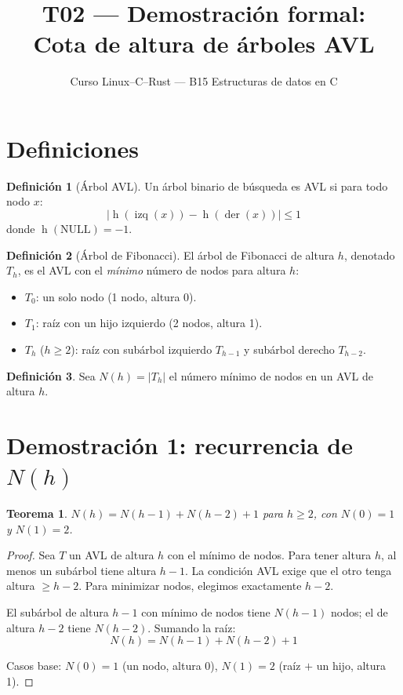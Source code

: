 \documentclass[11pt, letterpaper]{article}
\title{%
  T02 --- Demostración formal:\\[4pt]
  Cota de altura de árboles AVL
}
\author{Curso Linux--C--Rust --- B15 Estructuras de datos en C}
\date{}
\theoremstyle{definition}
\newtheorem{definition}{Definición}[section]
\theoremstyle{plain}
\newtheorem{theorem}{Teorema}[section]
\theoremstyle{remark}
\begin{document}
\maketitle
\tableofcontents

\section{Definiciones}

\begin{definition}[Árbol AVL]
Un árbol binario de búsqueda es AVL si para todo nodo $x$:
\[
  |\operatorname{h}(\operatorname{izq}(x)) - \operatorname{h}(\operatorname{der}(x))| \leq 1
\]
donde $\operatorname{h}(\text{NULL}) = -1$.
\end{definition}

\begin{definition}[Árbol de Fibonacci]
El árbol de Fibonacci de altura $h$, denotado $T_h$, es el AVL con el
\emph{mínimo} número de nodos para altura $h$:
\begin{itemize}
  \item $T_0$: un solo nodo (1 nodo, altura 0).
  \item $T_1$: raíz con un hijo izquierdo (2 nodos, altura 1).
  \item $T_h$ ($h \geq 2$): raíz con subárbol izquierdo $T_{h-1}$
    y subárbol derecho $T_{h-2}$.
\end{itemize}
\end{definition}

\begin{definition}
Sea $N(h) = |T_h|$ el número mínimo de nodos en un AVL de altura $h$.
\end{definition}

\section{Demostración 1: recurrencia de \texorpdfstring{$N(h)$}{N(h)}}

\begin{theorem}\label{thm:recurrence}
$N(h) = N(h-1) + N(h-2) + 1$ para $h \geq 2$, con $N(0) = 1$ y
$N(1) = 2$.
\end{theorem}

\begin{proof}
Sea $T$ un AVL de altura $h$ con el mínimo de nodos. Para tener
altura $h$, al menos un subárbol tiene altura $h-1$. La condición AVL
exige que el otro tenga altura $\geq h-2$. Para minimizar nodos,
elegimos exactamente $h-2$.

El subárbol de altura $h-1$ con mínimo de nodos tiene $N(h-1)$ nodos;
el de altura $h-2$ tiene $N(h-2)$. Sumando la raíz:
\[
  N(h) = N(h-1) + N(h-2) + 1
\]

Casos base: $N(0) = 1$ (un nodo, altura 0), $N(1) = 2$ (raíz $+$ un
hijo, altura 1).
\end{proof}
\end{document}
